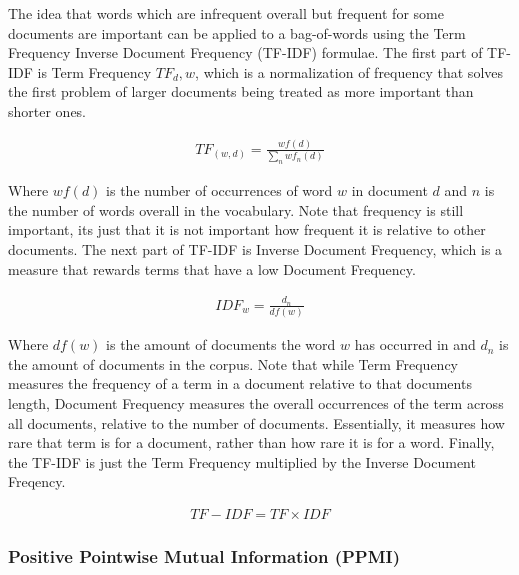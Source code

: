 The idea that words which are infrequent overall but frequent for some documents are important can be applied to a bag-of-words using the Term Frequency Inverse Document Frequency (TF-IDF) formulae. The first part of TF-IDF is Term Frequency $TF_d,w$, which is a normalization of frequency that solves the first problem of larger documents being treated as more important than shorter ones. 

\begin{align*}
TF_{(w, d)} =  \frac{{wf}(d)}{\sum_{n} {wf}_n(d)} 
\end{align*}

Where ${wf}(d)$ is the number of occurrences of word $w$ in document $d$ and $n$ is the number of words overall in the vocabulary. Note that frequency is still important, its just that it is not important how frequent it is relative to other documents.  The next part of TF-IDF is Inverse Document Frequency, which is a measure that rewards terms that have a low Document Frequency. 

\begin{align*}
IDF_{w} =  \frac{d_n}{{df}(w)} 
\end{align*}

Where ${df}(w)$ is the amount of documents the word $w$ has occurred in and $d_n$ is the amount of documents in the corpus. Note that while Term Frequency measures the frequency of a term in a document relative to that documents length, Document Frequency measures the overall occurrences of the term across all documents, relative to the number of documents. Essentially, it measures how rare that term is for a document, rather than how rare it is for a word. Finally, the TF-IDF is just the Term Frequency multiplied by the Inverse Document Freqency.

\begin{align*}
{TF-IDF} = TF \times IDF
\end{align*}


\subsubsection{Positive Pointwise Mutual Information (PPMI)}\label{bg:ppmi}




